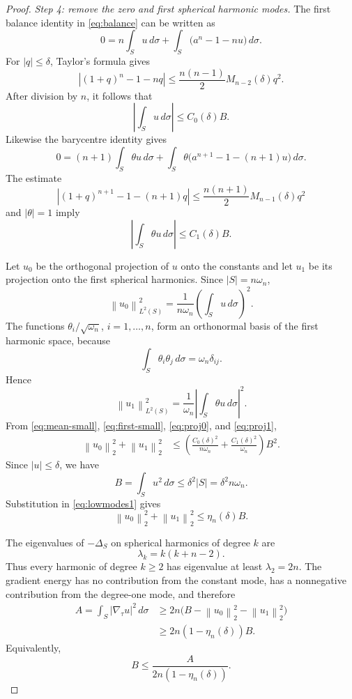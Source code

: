 \documentclass[11pt]{amsart}
\theoremstyle{definition}
\newcommand{\norm}[1]{\left\|#1\right\|}
\begin{document}
\begin{proof}
\smallskip\noindent\emph{Step 4: remove the zero and first spherical
harmonic modes.}
The first balance identity in \eqref{eq:balance} can be written as
\[
   0=n\int_Su\,d\sigma+
     \int_S\bigl(a^n-1-nu\bigr)\,d\sigma.
\]
For \(|q|\le\delta\), Taylor's formula gives
\[
   |(1+q)^n-1-nq|
   \le\frac{n(n-1)}2M_{n-2}(\delta)q^2.
\]
After division by \(n\), it follows that
\[
   \left|\int_Su\,d\sigma\right|
   \le C_0(\delta)B.
\tag{3.28}\label{eq:mean-small}
\]
Likewise the barycentre identity gives
\[
   0=(n+1)\int_S\theta u\,d\sigma+
      \int_S\theta\bigl(a^{n+1}-1-(n+1)u\bigr)\,d\sigma.
\]
The estimate
\[
   |(1+q)^{n+1}-1-(n+1)q|
   \le\frac{n(n+1)}2M_{n-1}(\delta)q^2
\]
and \(|\theta|=1\) imply
\[
   \left|\int_S\theta u\,d\sigma\right|
   \le C_1(\delta)B.
\tag{3.29}\label{eq:first-small}
\]

Let \(u_0\) be the orthogonal projection of \(u\) onto the constants and let
\(u_1\) be its projection onto the first spherical harmonics.  Since
\(|S|=n\omega_n\),
\[
   \norm{u_0}_{L^2(S)}^2
   =\frac1{n\omega_n}\left(\int_Su\,d\sigma\right)^2.
\tag{3.30}\label{eq:proj0}
\]
The functions \(\theta_i/\sqrt{\omega_n}\), \(i=1,\ldots,n\), form an
orthonormal basis of the first harmonic space, because
\[
   \int_S\theta_i\theta_j\,d\sigma=\omega_n\delta_{ij}.
\]
Hence
\[
   \norm{u_1}_{L^2(S)}^2
   =\frac1{\omega_n}\left|\int_S\theta u\,d\sigma\right|^2.
\tag{3.31}\label{eq:proj1}
\]
From \eqref{eq:mean-small}, \eqref{eq:first-small},
\eqref{eq:proj0}, and \eqref{eq:proj1},
\[
\begin{aligned}
   \norm{u_0}_{2}^2+\norm{u_1}_{2}^2
   &\le
   \left(\frac{C_0(\delta)^2}{n\omega_n}
       +\frac{C_1(\delta)^2}{\omega_n}\right)B^2.
\end{aligned}
\tag{3.32}\label{eq:lowmodes1}
\]
Since \(|u|\le\delta\), we have
\[
   B=\int_Su^2\,d\sigma\le\delta^2|S|=\delta^2n\omega_n.
\]
Substitution in \eqref{eq:lowmodes1} gives
\[
   \norm{u_0}_{2}^2+\norm{u_1}_{2}^2
   \le\eta_n(\delta)B.
\tag{3.33}\label{eq:lowmodes2}
\]

The eigenvalues of \(-\Delta_S\) on spherical harmonics of degree \(k\) are
\[
   \lambda_k=k(k+n-2).
\]
Thus every harmonic of degree \(k\ge2\) has eigenvalue at least
\(\lambda_2=2n\).  The gradient energy has no contribution from the constant
mode, has a nonnegative contribution from the degree-one mode, and therefore
\[
\begin{aligned}
   A=\int_S|\nabla_\tau u|^2\,d\sigma
   &\ge2n\bigl(B-\norm{u_0}_2^2-\norm{u_1}_2^2\bigr) \\
   &\ge2n(1-\eta_n(\delta))B.
\end{aligned}
\tag{3.34}\label{eq:Poincare-balanced}
\]
Equivalently,
\[
   B\le\frac{A}{2n(1-\eta_n(\delta))}.
\tag{3.35}\label{eq:B-by-A}
\]


\end{proof}
\end{document}
